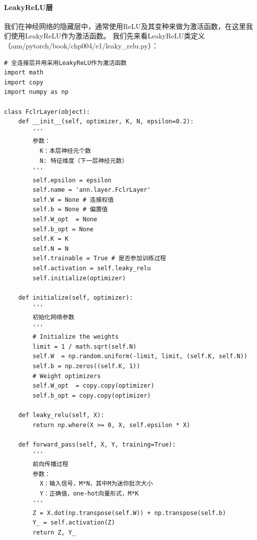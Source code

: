 \documentclass[UTF8]{article}
\begin{document}
\paragraph{LeakyReLU层}
我们在神经网络的隐藏层中，通常使用ReLU及其变种来做为激活函数，在这里我们使用LeakyReLU作为激活函数。\newline
我们先来看LeakyReLU类定义（ann/pytorch/book/chp004/e1/leaky\_relu.py）：
\begin{lstlisting}
# 全连接层并用采用LeakyReLU作为激活函数
import math
import copy
import numpy as np

class FclrLayer(object):
    def __init__(self, optimizer, K, N, epsilon=0.2):
        '''
        参数：
          K：本层神经元个数
          N: 特征维度（下一层神经元数）
        '''
        self.epsilon = epsilon
        self.name = 'ann.layer.FclrLayer'
        self.W = None # 连接权值
        self.b = None # 偏置值
        self.W_opt  = None
        self.b_opt = None
        self.K = K
        self.N = N
        self.trainable = True # 是否参加训练过程
        self.activation = self.leaky_relu
        self.initialize(optimizer)

    def initialize(self, optimizer):
        '''
        初始化网络参数
        '''
        # Initialize the weights
        limit = 1 / math.sqrt(self.N)
        self.W  = np.random.uniform(-limit, limit, (self.K, self.N))
        self.b = np.zeros((self.K, 1))
        # Weight optimizers
        self.W_opt  = copy.copy(optimizer)
        self.b_opt = copy.copy(optimizer)

    def leaky_relu(self, X):
        return np.where(X >= 0, X, self.epsilon * X)

    def forward_pass(self, X, Y, training=True):
        '''
        前向传播过程
        参数：
          X：输入信号，M*N，其中M为迷你批次大小
          Y：正确值，one-hot向量形式，M*K
        '''
        Z = X.dot(np.transpose(self.W)) + np.transpose(self.b)
        Y_ = self.activation(Z)
        return Z, Y_


\end{lstlisting}
\end{document}
